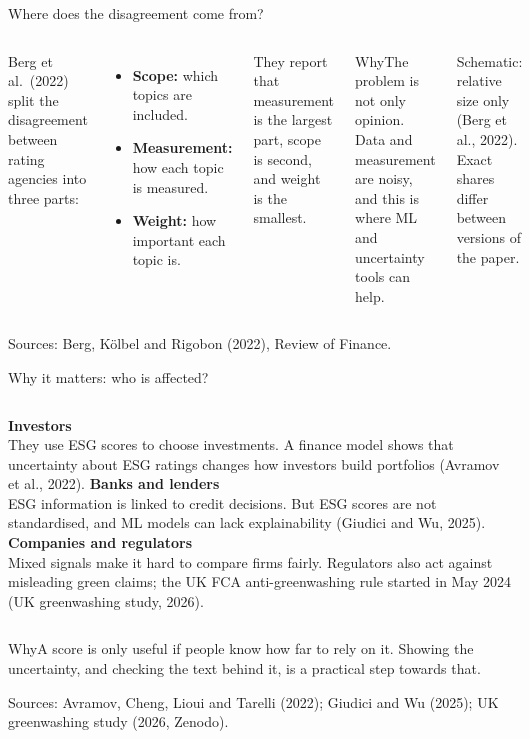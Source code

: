 \documentclass[aspectratio=169,11pt]{beamer}
\newcommand{\why}[1]{\vspace{2pt}\begin{block}{Why}#1\end{block}}
\newcommand{\src}[1]{\par\vfill{\tiny\color{navy!60}Sources: #1}}
\begin{document}
\begin{frame}[t]{Where does the disagreement come from?}
\begin{columns}[T]
Berg et al.\ (2022) split the disagreement between rating agencies into three parts:
\begin{itemize}
\setlength{\itemsep}{2pt}
\item \textbf{Scope:} which topics are included.
\item \textbf{Measurement:} how each topic is measured.
\item \textbf{Weight:} how important each topic is.
\end{itemize}
They report that measurement is the largest part, scope is second, and weight is the smallest.
\why{The problem is not only opinion. Data and measurement are noisy, and this is where ML and uncertainty tools can help.}
\vspace{0.3cm}
\centering
{}

{\tiny\color{navy!60}Schematic: relative size only (Berg et al., 2022). Exact shares differ between versions of the paper.}
\end{columns}
\src{Berg, K\"olbel and Rigobon (2022), Review of Finance.}
\end{frame}

\begin{frame}[t]{Why it matters: who is affected?}
\begin{columns}[T]
\textbf{\color{coral}Investors}\\[3pt]
They use ESG scores to choose investments. A finance model shows that uncertainty about ESG ratings changes how investors build portfolios (Avramov et al., 2022).
\textbf{\color{teal}Banks and lenders}\\[3pt]
ESG information is linked to credit decisions. But ESG scores are not standardised, and ML models can lack explainability (Giudici and Wu, 2025).
\textbf{\color{plum}Companies and regulators}\\[3pt]
Mixed signals make it hard to compare firms fairly. Regulators also act against misleading green claims; the UK FCA anti-greenwashing rule started in May 2024 (UK greenwashing study, 2026).
\end{columns}
\vspace{10pt}
\why{A score is only useful if people know how far to rely on it. Showing the uncertainty, and checking the text behind it, is a practical step towards that.}
\src{Avramov, Cheng, Lioui and Tarelli (2022); Giudici and Wu (2025); UK greenwashing study (2026, Zenodo).}
\end{frame}
\end{document}

